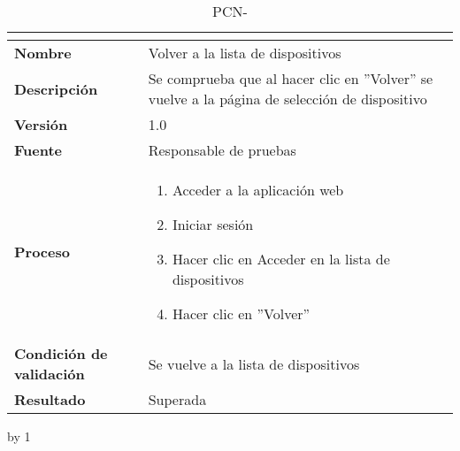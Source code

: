 \begin{table}[H]
	\caption{PCN-\number\pcn}
	\begin{tabular}{|l|p{}|}
		\hline
		\multicolumn{2}{|c|}{\cellcolor[HTML]{BFBFBF}{\color[HTML]{000000} \textbf{PCN-\number\pcn}}} \\ \hline
		\textbf{Nombre}                  & Volver a la lista de dispositivos                                                              \\ \hline
		\textbf{Descripción}             & Se comprueba que al hacer clic en ''Volver'' se vuelve a la página de selección de dispositivo \\ \hline
		\textbf{Versión}                 & 1.0                                                                                            \\ \hline
		\textbf{Fuente}                  & Responsable de pruebas                                                                         \\ \hline
		\textbf{Proceso}                 & \begin{enumerate}
			\item Acceder a la aplicación web
			\item Iniciar sesión
			\item Hacer clic en Acceder en la lista de dispositivos
			\item Hacer clic en ''Volver''
		\end{enumerate}                                                                     \\ \hline
		\textbf{Condición de validación} & Se vuelve a la lista de dispositivos                                                           \\ \hline
		\textbf{Resultado}               & Superada                                                                                       \\ \hline
	\end{tabular}
\end{table}
\advance\pcn by 1
